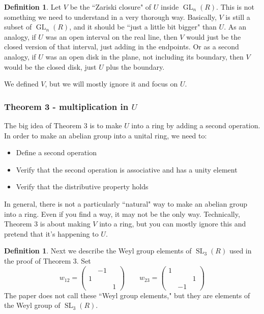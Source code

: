 \documentclass[12pt]{article}
\theoremstyle{definition}
\newtheorem{definition}[theorem]{Definition}
\numberwithin{theorem}{subsection}
\newcommand{\noi}{\noindent}
\DeclareMathOperator{\SL}{SL}
\DeclareMathOperator{\GL}{GL}
\begin{document}
\begin{definition}
Let $V$ be the ``Zariski closure" of $U$ inside $\GL_n(R)$. This is not something we need to understand in a very thorough way. Basically, $V$ is still a subset of $\GL_n(R)$, and it should be ``just a little bit bigger" than $U$. As an analogy, if $U$ was an open interval on the real line, then $V$ would just be the closed version of that interval, just adding in the endpoints. Or as a second analogy, if $U$ was an open disk in the plane, not including its boundary, then $V$ would be the closed disk, just $U$ plus the boundary.
\end{definition}

\noi We defined $V$, but we will mostly ignore it and focus on $U$.

\subsubsection*{Theorem 3 - multiplication in $U$}

The big idea of Theorem 3 is to make $U$ into a ring by adding a second operation. In order to make an abelian group into a unital ring, we need to:
\begin{itemize}
	\item Define a second operation
	\item Verify that the second operation is associative and has a unity element
	\item Verify that the distributive property holds
\end{itemize}
In general, there is not a particularly ``natural" way to make an abelian group into a ring. Even if you find a way, it may not be the only way. Technically, Theorem 3 is about making $V$ into a ring, but you can mostly ignore this and pretend that it's happening to $U$.

\begin{definition}
Next we describe the Weyl group elements of $\SL_3(R)$ used in the proof of Theorem 3. Set
\[
	w_{12} = 
	\begin{pmatrix}
		& -1 \\
		1 \\
		&& 1
	\end{pmatrix}
	\qquad
	w_{23} =
	\begin{pmatrix}
		1 \\
		&& 1 \\
		& -1
	\end{pmatrix}
\]
The paper does not call these ``Weyl group elements," but they are elements of the Weyl group of $\SL_3(R)$.
\end{definition}
\end{document}
